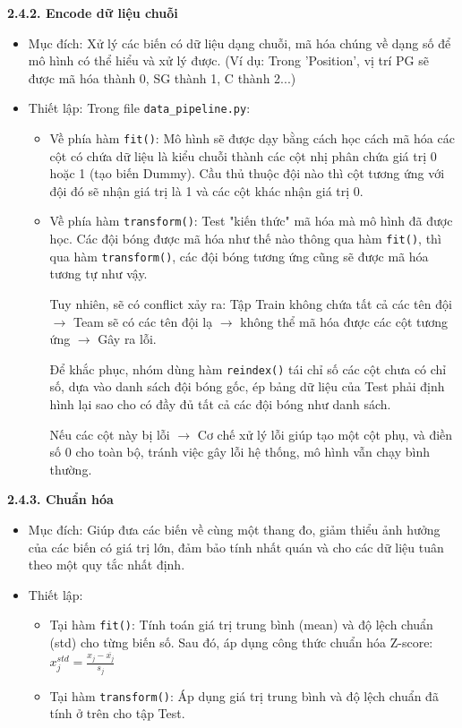 \textbf{2.4.2. Encode dữ liệu chuỗi}
\begin{itemize}
    \item Mục đích: Xử lý các biến có dữ liệu dạng chuỗi, mã hóa chúng về dạng số để mô hình có thể hiểu và xử lý được. (Ví dụ: Trong 'Position', vị trí PG sẽ được mã hóa thành 0, SG thành 1, C thành 2...)
    \item Thiết lập: Trong file \texttt{data\_pipeline.py}:
    \begin{itemize}
        \item Về phía hàm \texttt{fit()}: Mô hình sẽ được dạy bằng cách học cách mã hóa các cột có chứa dữ liệu là kiểu chuỗi thành các cột nhị phân chứa giá trị 0 hoặc 1 (tạo biến Dummy). Cầu thủ thuộc đội nào thì cột tương ứng với đội đó sẽ nhận giá trị là 1 và các cột khác nhận giá trị 0.
        \item Về phía hàm \texttt{transform()}: Test "kiến thức" mã hóa mà mô hình đã được học. Các đội bóng được mã hóa như thế nào thông qua hàm \texttt{fit()}, thì qua hàm \texttt{transform()}, các đội bóng tương ứng cũng sẽ được mã hóa tương tự như vậy.
        
        Tuy nhiên, sẽ có conflict xảy ra: Tập Train không chứa tất cả các tên đội $\rightarrow$ Team sẽ có các tên đội lạ $\rightarrow$ không thể mã hóa được các cột tương ứng $\rightarrow$ Gây ra lỗi.
        
        Để khắc phục, nhóm dùng hàm \texttt{reindex()} tái chỉ số các cột chưa có chỉ số, dựa vào danh sách đội bóng gốc, ép bảng dữ liệu của Test phải định hình lại sao cho có đầy đủ tất cả các đội bóng như danh sách.
        
        Nếu các cột này bị lỗi $\rightarrow$ Cơ chế xử lý lỗi giúp tạo một cột phụ, và điền số 0 cho toàn bộ, tránh việc gây lỗi hệ thống, mô hình vẫn chạy bình thường.
    \end{itemize}
\end{itemize}

\textbf{2.4.3. Chuẩn hóa}
\begin{itemize}
    \item Mục đích: Giúp đưa các biến về cùng một thang đo, giảm thiểu ảnh hưởng của các biến có giá trị lớn, đảm bảo tính nhất quán và cho các dữ liệu tuân theo một quy tắc nhất định.
    \item Thiết lập:
    \begin{itemize}
        \item Tại hàm \texttt{fit()}: Tính toán giá trị trung bình (mean) và độ lệch chuẩn (std) cho từng biến số. Sau đó, áp dụng công thức chuẩn hóa Z-score: $x_{j}^{std} = \frac{x_{j} - \overline{x_j}}{s_j}$
        \item Tại hàm \texttt{transform()}: Áp dụng giá trị trung bình và độ lệch chuẩn đã tính ở trên cho tập Test.
    \end{itemize}
\end{itemize}
